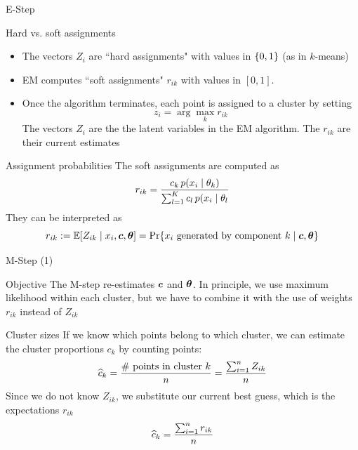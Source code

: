 \documentclass[10pt]{beamer}
\newcommand{\assign}{z} %
\newcommand{\Assign}{Z}
\newcommand{\soft}{r} %
\begin{document}
\begin{frame}{E-Step}
\footnotesize
\begin{sblock}{Hard vs. soft assignments}
\begin{itemize}
\item The vectors $\Assign_i$ are ``hard assignments" with values in $\{ {0,1} \}$ (as in $k$-means)
\item EM computes ``soft assignments" $\soft_{ik}$ with values in $[0,1]$.
\item Once the algorithm terminates, each point is assigned to a cluster by setting
\[ \assign_i = \arg\max_k \soft_{ik} \]
The vectors $\Assign_i$ are the the latent variables in the EM algorithm.  The $\soft_{ik}$ are their current estimates
\end{itemize}
\end{sblock}

\begin{sblock}{Assignment probabilities}
The soft assignments are computed as
\[ \soft_{ik} = \df{c_k \, p(x_i \cond \theta_k)}{ \sum_{l=1}^K c_l  \, p(x_i \cond \theta_l} \]
They can be interpreted as
\[  \soft_{ik} := \E [\Assign_{ik} \cond x_i, \+c, \+\theta] = \text{Pr} \set{x_i \text{ generated by component } k \cond \+c, \+\theta} \]
\end{sblock}
\end{frame}

\begin{frame}{M-Step (1)}

\begin{sblock}{Objective}
The M-step re-estimates ${\boldsymbol c}$ and ${\boldsymbol \theta}$.  In principle, we use maximum likelihood within each cluster, but we have to combine it with the use of weights $\soft_{ik}$ instead of $\Assign_{ik}$
\end{sblock}

\begin{sblock}{Cluster sizes}
If we know which points belong to which cluster, we can estimate the cluster proportions $c_k$ by counting points:
\[ \widehat{c}_k = \df{\text{\# points in cluster } k}{n} = \df{\sum_{i=1}^n \Assign_{ik}}{n}\]
Since we do not know $\Assign_{ik}$, we substitute our current best guess, which is the expectations $\soft_{ik}$
\[ \widehat{c}_k  = \df{\sum_{i=1}^n \soft_{ik}}{n}\]
\end{sblock}
\end{frame}
\end{document}

